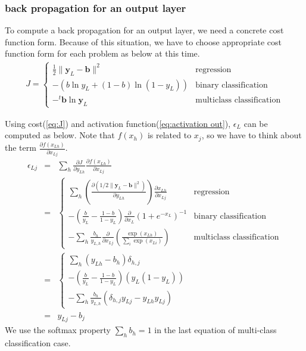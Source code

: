 \documentclass{article}
\begin{document}
\subsubsection{back propagation for an output layer}
To compute a back propagation for an output layer, we need a concrete cost function form.
Because of this situation, we have to choose appropriate cost function form for each
problem as below at this time.
\begin{eqnarray}
  J = 
  \begin{cases}
    \frac{1}{2} \lVert \bm{y}_L-\bm{b} \rVert ^2  &\mbox{regression }\\ 
    -(b \ln y_L + (1-b)\ln(1-y_L)) &\mbox{binary classification} \\
    -{}^t\bm{b} \ln \bm{y}_L &\mbox{multiclass classification} 
  \end{cases} \label{eq:J}
\end{eqnarray}

Using cost(\ref{eq:J}) and activation function(\ref{eq:activation out}),
$\epsilon_L$ can be computed as below.
Note that $f(x_h)$ is related to $x_j$, so we have to think about the term
$\frac{\partial f(x_{Lh})}{\partial x_{Lj}}$.
\begin{eqnarray}
  \epsilon_{Lj} 
  &=& \sum_h \frac{\partial J}{\partial y_{Lh}} \frac{\partial
    f(x_{Lh})}{\partial x_{Lj}}\\
  &=&
  \begin{cases}
    \sum_h (\frac{\partial (1/2 \lVert \bm{y}_L-\bm{b} \rVert ^2)}{\partial
      y_{Lh}}) \frac{\partial x_{Lh}}{\partial x_{Lj}}
    &\mbox{regression }\\
    -(\frac{b}{y_L} - \frac{1-b}{1-y_L}) \frac{\partial}{\partial
      x_{L}}(1+e^{-x_L})^{-1}   &\mbox{binary classification}\\
    -\sum_h \frac{b_h}{y_{L,h}} \frac{\partial}{\partial
      x_{Lj}}(\frac{\exp(x_{Lh})}{\sum_i \exp(x_{Li})})
    &\mbox{multiclass classification}
  \end{cases} \\
  &=&
  \begin{cases}
    \sum_h (y_{Lh}-b_h) \delta_{h,j}\\
    -(\frac{b}{y_L} - \frac{1-b}{1-y_L})(y_L(1-y_L))\\
    -\sum_h \frac{b_h}{y_{L,h}} (\delta_{h,j}y_{Lj} - y_{Lh}y_{Lj})
  \end{cases}\\
  &=&  y_{Lj}-b_j
\end{eqnarray}
We use the softmax property $\sum_h b_h = 1$ in the last equation of multi-class
classification case.
\end{document}
